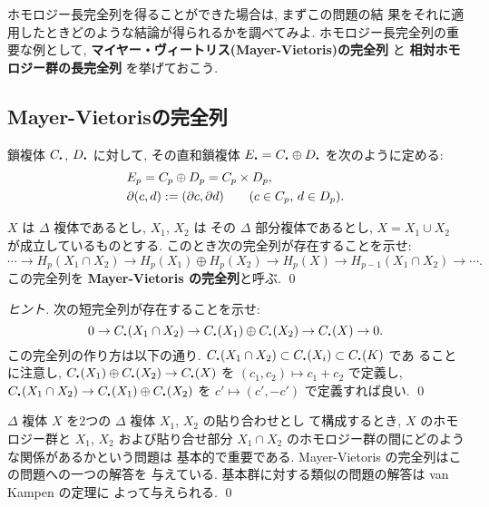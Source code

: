 \documentclass[12pt,twoside]{jarticle}
\begin{document}
\noindent ホモロジー長完全列を得ることができた場合は, まずこの問題の結
果をそれに適用したときどのような結論が得られるかを調べてみよ.
ホモロジー長完全列の重要な例として, 
{\bf マイヤー・ヴィートリス(Mayer-Vietoris)の完全列}
と
{\bf 相対ホモロジー群の長完全列}
を挙げておこう.


\subsection{Mayer-Vietorisの完全列}

鎖複体 $C_\bcdot$, $D_\bcdot$ に対して, その直和鎖複体 %
$E_\bcdot = C_\bcdot \oplus D_\bcdot$ を次のように定める:
\begin{align*}
& E_p = C_p \oplus D_p = C_p \times D_p,
\\
& \partial(c,d) := (\partial c, \partial d)
  \qquad (\text{$c\in C_p$, $d\in D_p$}).
\end{align*}

\begin{question}\qstar{*}
 $X$ は $\Delta$ 複体であるとし, $X_1$, $X_2$ は
 その $\Delta$ 部分複体であるとし,
 $X = X_1 \cup X_2$ が成立しているものとする. 
 このとき次の完全列が存在することを示せ:
 \[
  \cdots \to
  H_p(X_1\cap X_2) \to
  H_p(X_1)\oplus H_p(X_2) \to
  H_p(X) \to
  H_{p-1}(X_1\cap X_2) \to
  \cdots.
 \]
 この完全列を {\bf Mayer-Vietoris の完全列}と呼ぶ. \qed
\end{question}

\begin{proof}[ヒント]
次の短完全列が存在することを示せ:
\[
  0 \to
  C_\bcdot(X_1\cap X_2) \to
  C_\bcdot(X_1)\oplus C_\bcdot(X_2) \to
  C_\bcdot(X) \to
  0.
\] %
この完全列の作り方は以下の通り. %
$C_\bcdot(X_1\cap X_2) \subset C_\bcdot(X_i) \subset C_\bcdot(K)$ であ
ることに注意し, $C_\bcdot(X_1)\oplus C_\bcdot(X_2)\to C_\bcdot(X)$ を %
$(c_1,c_2) \mapsto c_1 + c_2$ で定義し, %
$C_\bcdot(X_1\cap X_2)\to C_\bcdot(X_1)\oplus C_\bcdot(X_2)$ を %
$c' \mapsto (c', -c')$ で定義すれば良い. \qed
\end{proof}

\begin{guide}
$\Delta$ 複体 $X$ を2つの $\Delta$ 複体 $X_1$, $X_2$ の貼り合わせとし
て構成するとき, $X$ のホモロジー群と $X_1$, $X_2$ および貼り合せ部分 
$X_1\cap X_2$ のホモロジー群の間にどのような関係があるかという問題は
基本的で重要である. Mayer-Vietoris の完全列はこの問題への一つの解答を
与えている.  基本群に対する類似の問題の解答は van Kampen の定理に
よって与えられる.
\qed
\end{guide}
\end{document}
